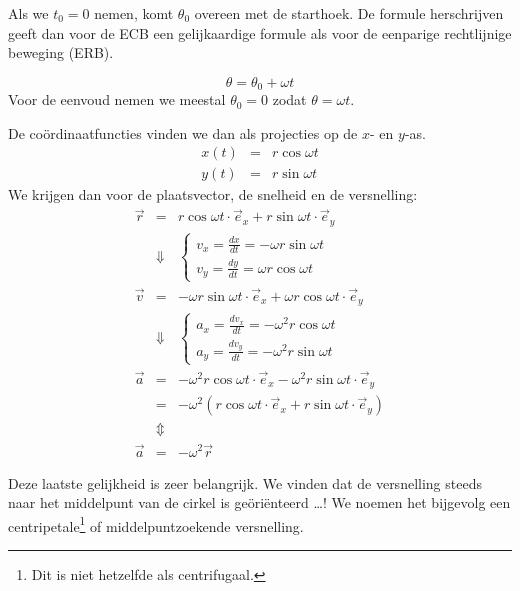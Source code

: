 \documentclass{ximera}
\begin{document}
Als we \(t_0 = 0\) nemen, komt \(\theta_0\) overeen met de starthoek. 
De formule herschrijven geeft dan voor de ECB een gelijkaardige formule als voor de eenparige rechtlijnige beweging (ERB).

\begin{equation*}
	\theta=\theta_0+\omega t
\end{equation*}
Voor de eenvoud nemen we meestal $\theta_0=0$ zodat $\theta=\omega t$. 



De coördinaatfuncties vinden we dan als projecties op de $x$- en $y$-as. 
\begin{eqnarray*}
	x(t)&=&r\cos\omega t\\
	y(t)&=&r\sin\omega t
\end{eqnarray*}
We krijgen dan voor de plaatsvector, de snelheid en de versnelling:
\begin{eqnarray}
	\vec{r}&=&r\cos\omega t\cdot\vec{e}_x+r\sin\omega t\cdot\vec{e}_y\nonumber\\
	&\Downarrow&
	\left\{
		\begin{array}{l}
			v_x=\frac{dx}{dt}=-\omega r\sin\omega t\\
			v_y=\frac{dy}{dt}=\omega r\cos\omega t
		\end{array}
	\right.\nonumber\\
	\vec{v}&=&-\omega r\sin\omega t\cdot\vec{e}_x+\omega r\cos\omega t\cdot\vec{e}_y\nonumber\\
	&\Downarrow&
	\left\{
		\begin{array}{l}
			a_x=\frac{dv_x}{dt}=-\omega^2 r\cos\omega t\\
			a_y=\frac{dv_y}{dt}=-\omega^2 r\sin\omega t
		\end{array}
	\right.\nonumber\\
	\vec{a}&=&-\omega^2 r\cos\omega t\cdot\vec{e}_x-\omega^2 r\sin\omega t\cdot\vec{e}_y\nonumber\\
	&=&-\omega^2(r\cos\omega t\cdot\vec{e}_x+r\sin\omega t\cdot\vec{e}_y)\nonumber\\
	&\Updownarrow&\nonumber\\
	\vec{a}&=&-\omega^2\vec{r}\label{versnelling}
\end{eqnarray}

Deze laatste gelijkheid is zeer belangrijk. We vinden dat de versnelling steeds naar het middelpunt van de cirkel is ge\"ori\"enteerd \ldots! We noemen het bijgevolg een centripetale\footnote{Dit is niet hetzelfde als centrifugaal.} of middelpuntzoekende versnelling.
\end{document}
